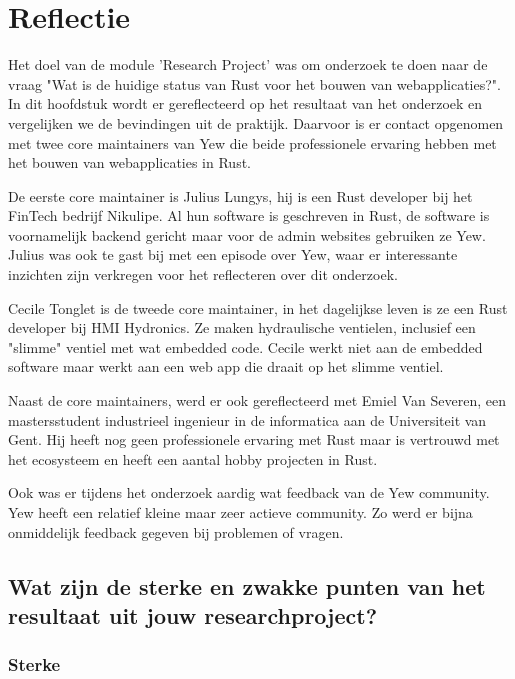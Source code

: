 \chapter{Reflectie}
\label{reflectie}

Het doel van de module 'Research Project' was om onderzoek te doen naar de vraag "Wat is de huidige
status van Rust voor het bouwen van webapplicaties?". In dit hoofdstuk wordt er gereflecteerd op het
resultaat van het onderzoek en vergelijken we de bevindingen uit de praktijk. Daarvoor is er contact
opgenomen met twee core maintainers van Yew die beide professionele ervaring hebben met het bouwen
van webapplicaties in Rust. 

De eerste core maintainer is Julius Lungys, hij is een Rust developer bij het FinTech bedrijf
Nikulipe. Al hun software is geschreven in Rust, de software is voornamelijk backend gericht maar
voor de admin websites gebruiken ze Yew. Julius was ook te gast bij 
\cite{podcast} met een episode over Yew, waar er interessante inzichten zijn verkregen voor het
reflecteren over dit onderzoek.

Cecile Tonglet is de tweede core maintainer, in het dagelijkse leven is ze een Rust developer bij
HMI Hydronics. Ze maken hydraulische ventielen, inclusief een "slimme" ventiel met wat embedded
code. Cecile werkt niet aan de embedded software maar werkt aan een web app die draait op het slimme
ventiel.

Naast de core maintainers, werd er ook gereflecteerd met Emiel Van Severen, een mastersstudent
industrieel ingenieur in de informatica aan de Universiteit van Gent. Hij heeft nog geen
professionele ervaring met Rust maar is vertrouwd met het ecosysteem en heeft een aantal hobby
projecten in Rust.

Ook was er tijdens het onderzoek aardig wat feedback van de Yew community. Yew heeft een relatief
kleine maar zeer actieve community. Zo werd er bijna onmiddelijk feedback gegeven bij problemen of
vragen.

\clearpage

\section{Wat zijn de sterke en zwakke punten van het resultaat uit jouw researchproject?}

\subsection{Sterke}

